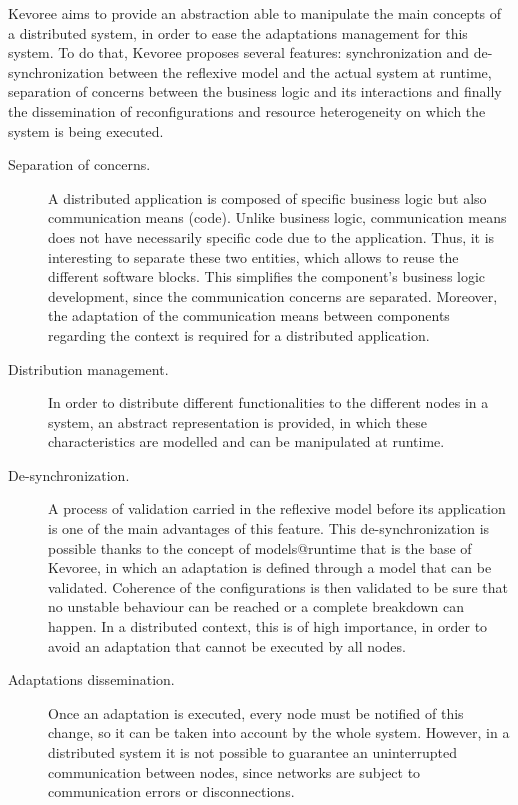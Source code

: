 Kevoree aims to provide an abstraction able to manipulate the main concepts of a distributed system, in order to ease the adaptations management for this system.
To do that, Kevoree proposes several features: synchronization and de-synchronization between the reflexive model and the actual system at runtime, separation of concerns between the business logic and its interactions and finally the dissemination of reconfigurations and resource heterogeneity on which the system is being executed.
\begin{description}
	\item [Separation of concerns.] A distributed application is composed of specific business logic but also communication means (code).
	Unlike business logic, communication means does not have necessarily specific code due to the application.
	Thus, it is interesting to separate these two entities, which allows to reuse the different software blocks.
	This simplifies the component's business logic development, since the communication concerns are separated.
	Moreover, the adaptation of the communication means between components regarding the context is required for a distributed application.
	\item [Distribution management.] In order to distribute different functionalities to the different nodes in a system, an abstract representation is provided, in which these characteristics are modelled and can be manipulated at runtime.
	\item [De-synchronization.] A process of validation carried in the reflexive model before its application is one of the main advantages of this feature.
	This de-synchronization is possible thanks to the concept of models@runtime that is the base of Kevoree, in which an adaptation is defined through a model that can be validated.
	Coherence of the configurations is then validated to be sure that no unstable behaviour can be reached or a complete breakdown can happen.
	In a distributed context, this is of high importance, in order to avoid an adaptation that cannot be executed by all nodes.
	\item [Adaptations dissemination.] Once an adaptation is executed, every node must be notified of this change, so it can be taken into account by the whole system.
	However, in a distributed system it is not possible to guarantee an uninterrupted communication between nodes, since networks are subject to communication errors or disconnections.

\end{description}
